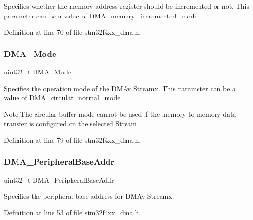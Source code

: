 Specifies whether the memory address register should be incremented or not. This parameter can be a value of \hyperlink{group___d_m_a__memory__incremented__mode}{D\+M\+A\+\_\+memory\+\_\+incremented\+\_\+mode} 

Definition at line 70 of file stm32f4xx\+\_\+dma.\+h.

\mbox{\label{struct_d_m_a___init_type_def_a5f09c16a03a50120c1a1a49ae6a7c667}} 
\subsubsection{\texorpdfstring{D\+M\+A\+\_\+\+Mode}{DMA\_Mode}}
{\footnotesize\ttfamily uint32\+\_\+t D\+M\+A\+\_\+\+Mode}

Specifies the operation mode of the D\+M\+Ay Streamx. This parameter can be a value of \hyperlink{group___d_m_a__circular__normal__mode}{D\+M\+A\+\_\+circular\+\_\+normal\+\_\+mode} \begin{DoxyNote}{Note}
The circular buffer mode cannot be used if the memory-\/to-\/memory data transfer is configured on the selected Stream 
\end{DoxyNote}


Definition at line 79 of file stm32f4xx\+\_\+dma.\+h.

\mbox{\label{struct_d_m_a___init_type_def_ad02abd574cca0caeacd0cc05d2174a42}} 
\subsubsection{\texorpdfstring{D\+M\+A\+\_\+\+Peripheral\+Base\+Addr}{DMA\_PeripheralBaseAddr}}
{\footnotesize\ttfamily uint32\+\_\+t D\+M\+A\+\_\+\+Peripheral\+Base\+Addr}

Specifies the peripheral base address for D\+M\+Ay Streamx. 

Definition at line 53 of file stm32f4xx\+\_\+dma.\+h.

